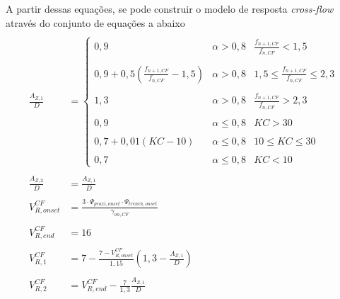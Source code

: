 A partir dessas equações, se pode construir o modelo de resposta \textit{cross-flow} através do conjunto de equações a abaixo
\begin{equation}
\label{eq:jdsn-azdj}
\begin{aligned}
\\
\frac{A_{Z,1}}{D} &= 
\left\{
\begin{array}{ccc} 
0,9                                                      & \alpha > 0,8   &         \frac{f_{n+1,CF}}{f_{n,CF}} <   1,5 \\
\\
0,9 + 0,5 \left(\frac{f_{n+1,CF}}{f_{n,CF}} - 1,5\right) & \alpha > 0,8   & 1,5 \le \frac{f_{n+1,CF}}{f_{n,CF}} \le 2,3 \\
\\
1,3                                                      & \alpha > 0,8   &         \frac{f_{n+1,CF}}{f_{n,CF}} >   2,3 \\
\\
0,9                                                      & \alpha \le 0,8 &        \mathit{KC} >   30 \\
\\
0,7 + 0,01 (\mathit{KC} -10)                             & \alpha \le 0,8 & 10 \le \mathit{KC} \le 30 \\
\\
0,7                                                      & \alpha \le 0,8 &        \mathit{KC} <   10 
\end{array}
\right.\\
\\
\frac{A_{Z,2}}{D}                &= \frac{A_{Z,1}}{D}\\
\\
V_{R,\mathit{onset}}^\mathit{CF} &= \frac{3 \cdot \Psi_{\mathit{proxi}, \mathit{onset}} \cdot  \Psi_{\mathit{trench}, \mathit{onset}}}{\gamma_{\mathit{on}, \mathit{CF}}}\\
\\
V_{R,\mathit{end}}^\mathit{CF}   &= 16\\
\\
V_{R, 1}^\mathit{CF}             &= 7 - \frac{7 - V^\mathit{CF}_{R, \mathit{onset}}}{1,15} \left(1,3 - \frac{A_{Z,1}}{D}\right)\\
\\
V_{R, 2}^\mathit{CF}             &= V^\mathit{CF}_{R, \mathit{end}} - \frac{7}{1,3} \frac{A_{Z, 1}}{D}\\
\end{aligned}
\end{equation}


